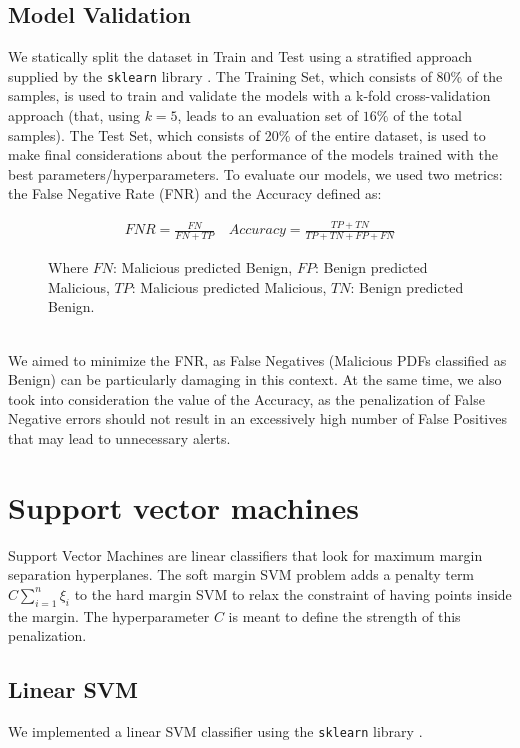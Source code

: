 \documentclass[twocolumn, switch]{article} %
\begin{document}
\subsection{Model Validation}
We statically split the dataset in Train and Test using a stratified approach supplied by the \texttt{sklearn} library \cite{scikit-learn}. The Training Set, which consists of 80\% of the samples, is used to train and validate the models with a k-fold cross-validation approach (that, using $k=5$, leads to an evaluation set of $16\%$ of the total samples). The Test Set, which consists of 20\% of the entire dataset, is used to make final considerations about the performance of the models trained with the best parameters/hyperparameters.
To evaluate our models, we used two metrics: the False Negative Rate (FNR) and the Accuracy defined as:
\begin{figure}[ht]
	\begin{align*}
		FNR = \frac{FN}{FN + TP} \quad Accuracy = \frac{TP+TN}{TP+TN+FP+FN}
	\end{align*}
	\caption*{\footnotesize{Where $FN$: Malicious predicted Benign, $FP$: Benign predicted Malicious, $TP$: Malicious predicted Malicious, $TN$: Benign predicted Benign.}}
\end{figure}
\\We aimed to minimize the FNR, as False Negatives (Malicious PDFs classified as Benign) can be particularly damaging in this context.
At the same time, we also took into consideration the value of the Accuracy, as the penalization of False Negative errors should not result in an excessively high number of False Positives that may lead to unnecessary alerts.

\section{Support vector machines}
\label{sec:svm}
Support Vector Machines are linear classifiers that look for maximum margin separation hyperplanes.
The soft margin SVM problem adds a penalty term $C\sum_{i=1}^{n}\xi_i$ to the hard margin SVM to relax the constraint of having points inside the margin. The hyperparameter $C$ is meant to define the strength of this penalization.
\subsection{Linear SVM}
We implemented a linear SVM classifier using the \texttt{sklearn} library \cite{scikit-learn}.
\end{document}
